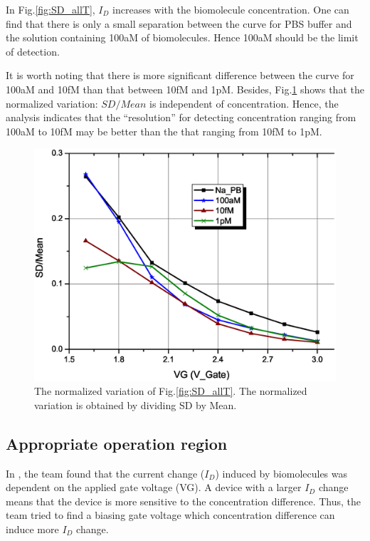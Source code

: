 In Fig.\ref{fig:SD_allT}, $I_D$ increases with the biomolecule concentration.
One can find that there is only a small separation between the curve for PBS buffer and the solution containing 100aM of biomolecules.
Hence 100aM should be the limit of detection.

It is worth noting that there is more significant difference between the curve for 100aM and 10fM than that between 10fM and 1pM.
Besides, Fig.\ref{fig:SD_allT2} shows that the normalized variation: ${SD} / {Mean}$ is independent of concentration.
Hence, the analysis indicates that the ``resolution'' for detecting concentration ranging from 100aM to 10fM may be better than the that ranging from 10fM to 1pM.
\begin{figure}[tb]
    \includegraphics[width=1\textwidth]{images/chapter3/128_allT_error.eps}
    \caption{The normalized variation of Fig.\ref{fig:SD_allT}. The normalized variation is obtained by dividing SD by Mean.}
    \label{fig:SD_allT2}
\end{figure}

\subsection{Appropriate operation region} \label{section:biasVg}
In \cite{C6}, the team found that the current change ($I_D$) induced by biomolecules was dependent on the applied gate voltage (VG).
A device with a larger $I_D$ change means that the device is more sensitive to the concentration difference.
Thus, the team tried to find a biasing gate voltage which concentration difference can induce more $I_D$ change.

